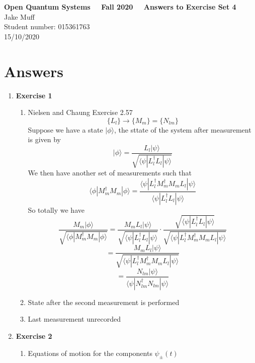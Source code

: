 \documentclass[12pt]{article}
\newcommand{\ket}[1]{\vert{#1}\rangle}
\begin{document}
\normalsize

\baselineskip 14pt

\begin{center}
{\Large {\bf Open Quantum Systems \ \ Fall 2020 \ \  Answers to Exercise Set 4}}\\
{\large { Jake Muff}}\\
{Student number: 015361763}\\
{15/10/2020}
\end{center}


\section{Answers}
\begin{enumerate}

\item \textbf{Exercise 1}
\begin{enumerate}
    \item Nielsen and Chaung Exercise 2.57\\
    $$ \{ L_l \} \rightarrow \{ M_m \} = \{ N_{lm} \} $$
    Suppose we have a state $\ket{\phi}$, the sttate of the system after measurement is given by 
    $$ \ket{\phi} = \frac{L_l \ket{\psi}}{\sqrt{\langle \psi|L_l^\dagger L_l | \psi \rangle}} $$
    We then have another set of measurements such that 
    $$ \langle \phi | M_m^\dagger M_m | \phi \rangle = \frac{\langle \psi | L_l^\dagger M_m^\dagger M_m L_l | \psi \rangle}{\langle \psi | L_l^\dagger L_l | \psi \rangle }$$
    So totally we have 
    $$ \frac{M_m \ket{\phi}}{\sqrt{\langle \phi | M_m^\dagger M_m | \phi \rangle}} = \frac{M_m L_l \ket{\psi}}{\sqrt{\langle \psi | L_l^\dagger L_l | \psi \rangle}} \cdot \frac{\sqrt{\langle \psi | L_l^\dagger L_l | \psi \rangle}}{\sqrt{\langle \psi | L_l^\dagger M_m^\dagger M_m L_l | \psi \rangle}} $$
    $$ = \frac{M_m L_l \ket{\psi}}{\sqrt{\langle \psi | L_l^\dagger M_m^\dagger M_m L_l | \psi \rangle}} $$
    $$ = \frac{N_{lm} \ket{\psi}}{\langle \psi | N_{lm}^\dagger N_{lm}  | \psi \rangle } $$

    \item State after the second measurement is performed \\
    \item Last measurement unrecorded 
\end{enumerate}

\item \textbf{Exercise 2}
\begin{enumerate}
    \item Equations of motion for the components $\psi_{\pm}(t)$ \\
    

\end{enumerate}
\end{enumerate}
\end{document}
